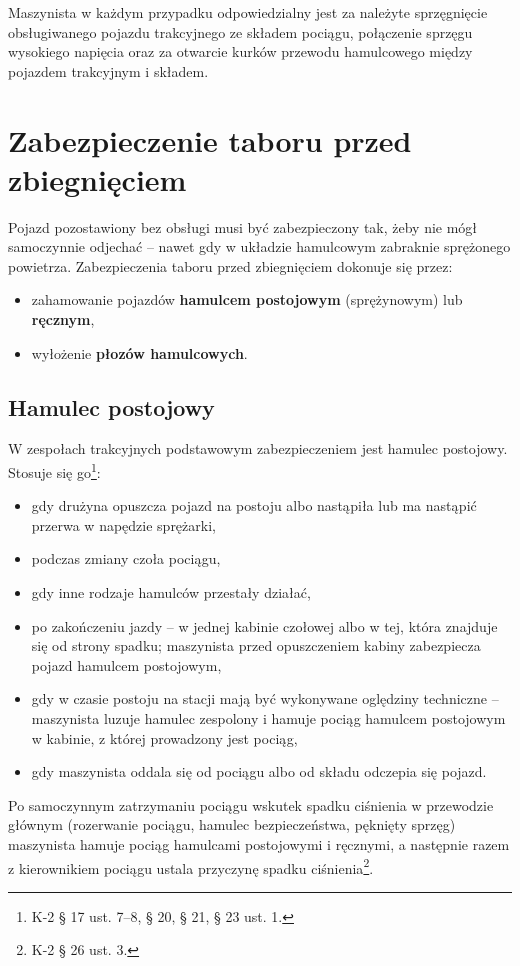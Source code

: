Maszynista w każdym przypadku odpowiedzialny jest za należyte sprzęgnięcie obsługiwanego pojazdu trakcyjnego ze składem pociągu, połączenie sprzęgu wysokiego napięcia oraz za otwarcie kurków przewodu hamulcowego między pojazdem trakcyjnym i składem. 

\chapter{Zabezpieczenie taboru przed zbiegnięciem}

Pojazd pozostawiony bez obsługi musi być zabezpieczony tak, żeby nie mógł samoczynnie odjechać – nawet gdy w układzie hamulcowym zabraknie sprężonego powietrza. Zabezpieczenia taboru przed zbiegnięciem dokonuje się przez:
\begin{itemize}
	\item zahamowanie pojazdów \textbf{hamulcem postojowym} (sprężynowym) lub \textbf{ręcznym},
	\item wyłożenie \textbf{płozów hamulcowych}.
\end{itemize}

\section{Hamulec postojowy}

W zespołach trakcyjnych podstawowym zabezpieczeniem jest hamulec postojowy. Stosuje się go\footnote{K-2 § 17 ust. 7–8, § 20, § 21, § 23 ust. 1.}:
\begin{itemize}
	\item gdy drużyna opuszcza pojazd na postoju albo nastąpiła lub ma nastąpić przerwa w napędzie sprężarki,
	\item podczas zmiany czoła pociągu,
	\item gdy inne rodzaje hamulców przestały działać,
	\item po zakończeniu jazdy – w jednej kabinie czołowej albo w tej, która znajduje się od strony spadku; maszynista przed opuszczeniem kabiny zabezpiecza pojazd hamulcem postojowym,
	\item gdy w czasie postoju na stacji mają być wykonywane oględziny techniczne – maszynista luzuje hamulec zespolony i hamuje pociąg hamulcem postojowym w kabinie, z której prowadzony jest pociąg,
	\item gdy maszynista oddala się od pociągu albo od składu odczepia się pojazd.
\end{itemize}
Po samoczynnym zatrzymaniu pociągu wskutek spadku ciśnienia w przewodzie głównym (rozerwanie pociągu, hamulec bezpieczeństwa, pęknięty sprzęg) maszynista hamuje pociąg hamulcami postojowymi i ręcznymi, a następnie razem z kierownikiem pociągu ustala przyczynę spadku ciśnienia\footnote{K-2 § 26 ust. 3.}.

